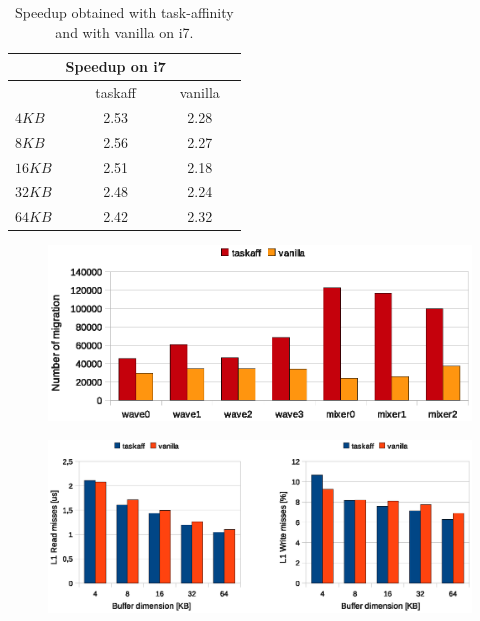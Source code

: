 \begin{table}[htbp]
\begin{center}
\begin{tabular}{l|c|c|c}
	\hline
	& Speedup on i7 \\ \hline
	& taskaff & vanilla \\ \hline
	$4KB$ & 2.53 & 2.28 \\ \hline
	$8KB$ & 2.56  & 2.27 \\ \hline
	$16KB$ & 2.51 & 2.18 \\ \hline
	$32KB$ & 2.48 & 2.24 \\ \hline
	$64KB$ & 2.42 & 2.32 \\ \hline
\end{tabular}
\caption{Speedup obtained with task-affinity and with vanilla on i7.}
\label{tab:speedup_i7}
\end{center}
\end{table}

\begin{figure}[htbp]
\centering
\includegraphics[width=\widefigure]{images/results_i7/migration_i7.eps}
\caption{}
\label{fig:migration_i7}
\end{figure}

\begin{figure}[htbp]
\centering
\includegraphics[width=\widefigure]{images/results_i7/l1_load_store_i7.eps}
\caption{}
\label{fig:l1_load_store_i7}
\end{figure}

